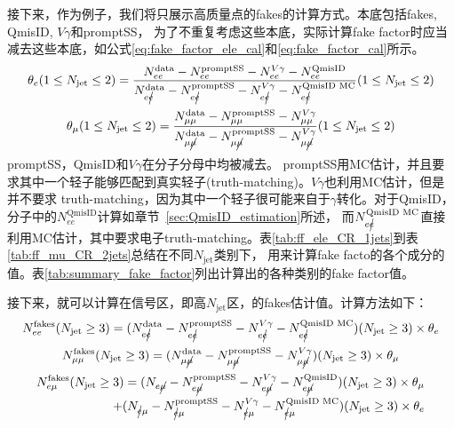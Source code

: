 接下来，作为例子，我们将只展示高质量点的fakes的计算方式。本底包括fakes, QmisID, $V\gamma$和promptSS，
为了不重复考虑这些本底，实际计算fake factor时应当减去这些本底，如公式\ref{eq:fake_factor_ele_cal}和\ref{eq:fake_factor_cal}所示。
\begin{equation}
\theta_{e}(1\leq N_{\text{jet}}\leq 2)=\frac{N_{ee}^{\text{data}}-N_{ee}^{\text{promptSS}}-N_{ee}^{V\gamma}-N_{ee}^{\text{QmisID}}}{N_{e\cancel{e}}^{\text{data}}-N_{e\cancel{e}}^{\text{promptSS}}-N_{e\cancel{e}}^{V\gamma}-N_{e\cancel{e}}^{\text{QmisID MC}}}(1\leq N_{\text{jet}}\leq 2)
\label{eq:fake_factor_ele_cal}
\end{equation}
\begin{equation}
\theta_{\mu}(1\leq N_{\text{jet}}\leq 2)=\frac{N_{\mu\mu}^{\text{data}}-N_{\mu\mu}^{\text{promptSS}}-N_{\mu\mu}^{V\gamma}}{N_{\mu\cancel{\mu}}^{\text{data}}-N_{\mu\cancel{\mu}}^{\text{promptSS}}-N_{\mu\cancel{\mu}}^{V\gamma}}(1\leq N_{\text{jet}}\leq 2)
\label{eq:fake_factor_cal}
\end{equation}
promptSS，QmisID和$V\gamma$在分子分母中均被减去。
promptSS用MC估计，并且要求其中一个轻子能够匹配到真实轻子(truth-matching)。$V\gamma$也利用MC估计，但是并不要求
truth-matching，因为其中一个轻子很可能来自于$\gamma$转化。对于QmisID，分子中的$N_{ee}^{\text{QmisID}}$计算如章节~\ref{sec:QmisID_estimation}所述，
而$N_{e\cancel{e}}^{\text{QmisID MC}}$直接利用MC估计，其中要求电子truth-matching。表\ref{tab:ff_ele_CR_1jets}到表\ref{tab:ff_mu_CR_2jets}总结在不同$N_{\text{jet}}$类别下，
用来计算fake facto的各个成分的值。表\ref{tab:summary_fake_factor}列出计算出的各种类别的fake factor值。



\clearpage
接下来，就可以计算在信号区，即高$N_{\text{jet}}$区，的fakes估计值。计算方法如下：
\begin{equation}
N_{ee}^{\text{fakes}}(N_{\text{jet}}\geq 3)=(N_{e\cancel{e}}^{\text{data}}-N_{e\cancel{e}}^{\text{promptSS}}-N_{e\cancel{e}}^{V\gamma}-N_{e\cancel{e}}^{\text{QmisID MC}})(N_{\text{jet}}\geq 3)\times \theta_{e}
\end{equation}
\begin{equation}
N_{\mu\mu}^{\text{fakes}}(N_{\text{jet}}\geq 3)=(N_{\mu\cancel{\mu}}^{\text{data}}-N_{\mu\cancel{\mu}}^{\text{promptSS}}-N_{\mu\cancel{\mu}}^{V\gamma})(N_{\text{jet}}\geq 3)\times \theta_{\mu}
\end{equation}
\begin{equation}
\begin{split}
N_{e\mu}^{\text{fakes}}(N_{\text{jet}}\geq 3)=(N_{e\cancel{\mu}}-N_{e\cancel{\mu}}^{\text{promptSS}}-N_{e\cancel{\mu}}^{V\gamma}-N_{e\cancel{\mu}}^{\text{QmisID}})(N_{\text{jet}}\geq 3)\times \theta_{\mu} \\ +
       (N_{\cancel{e}\mu}-N_{\cancel{e}\mu}^{\text{promptSS}}-N_{\cancel{e}\mu}^{V\gamma}-N_{\cancel{e}\mu}^{\text{QmisID MC}})(N_{\text{jet}}\geq 3)\times \theta_{e}
\end{split}
\end{equation}
